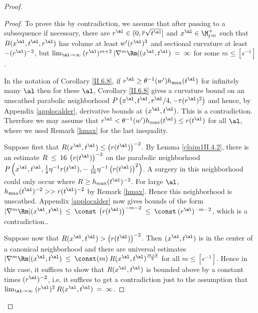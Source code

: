 \begin{proof}
\begin{proof}
To prove this by contradiction, we  assume that after passing
to a subsequence if necessary, there are  $r^\al\in (0,\overline{r} \sqrt{t^\al}]$
and $x^\al \in \M_{t^\al}^+$ such that $B(x^\al, t^\al,r^\al)$ has
volume
at least $w^\prime (r^\al)^3$ and sectional curvature at least
$-(r^\al)^{-2}$, but $\lim_{\al \rightarrow \infty} \:
(r^\al)^{m+2} \: |\nabla^m \Rm|(x^\al, t^\al) \: = \:
\infty$
for some $m \le [\epsilon^{-1}]$.

In the notation of Corollary \ref{II.6.8}, if
$r^\al \ge \theta^{-1}(w^\prime) h_{\max}(t^\al)$ for infinitely many $\al$
then for these $\al$, Corollary \ref{II.6.8} gives a curvature bound on an unscathed
parabolic neighborhood
$P \left( x^\al, t^\al, r^\al/4, - \tau (r^\al)^2 \right)$ and hence,
by Appendix \ref{applocalder}, derivative bounds at $(x^\al, t^\al)$.
This is a contradiction.  Therefore we may assume that
$r^\al < \theta^{-1}(w^\prime) h_{\max}(t^\al) \le r(t^\al)$ for all $\al$,
where we used Remark \ref{hmax} for the last inequality.

Suppose first that
$R(x^\al, t^\al) \le \left( r(t^\al) \right)^{-2}$.
By Lemma \ref{claim1II.4.2}, there is an estimate
$R \: \le \: 16 \: \left( r(t^\al) \right)^{-2}$ on the parabolic neighborhood
$P \left( x^\al, t^\al, \frac14 \eta^{-1} r(t^\al),
- \: \frac{1}{16} \eta^{-1} \left( r(t^\al) \right)^2 \right)$.
A surgery in this neighborhood could only occur where
$R \ge h_{\max}(t^\al)^{-2}$. For large $\al$,
$h_{\max}(t^\al)^{-2} >> r(t^\al)^{-2}$ by Remark \ref{hmax}.
Hence this neighborhood is unscathed.
Appendix \ref{applocalder} now gives bounds of the form
$|\nabla^m \Rm|(x^\al, t^\al) \: \le \: \const \:
\left( r(t^\al) \right)^{-m-2} \: \le \: \const \:
(r^\al)^{-m-2}$, which is a contradiction..

Suppose now that $R(x^\al, t^\al) > \left( r(t^\al) \right)^{-2}$.
Then $(x^\al, t^\al)$ is in the center of a canonical neighborhood and there
are universal estimates $|\nabla^m \Rm|(x^\al, t^\al) \: \le \: \const(m) \:
R(x^\al, t^\al)^{\frac{m+2}{2}}$ for all $m \le [\epsilon^{-1}]$. Hence
in this case, it suffices to show that $R(x^\al, t^\al)$ is bounded above by
a constant times $(r^\al)^{-2}$, i.e. it suffices to get a contradiction
just to the assumption that
$\lim_{\al \rightarrow \infty} \:
(r^\al)^{2} \: R(x^\al, t^\al) \: = \: \infty$.


\end{proof}
\end{proof}
